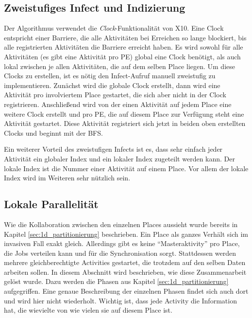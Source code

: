 \subsection{Zweistufiges Infect und Indizierung} %
\label{sub:zweistufiges_infect}
Der Algorithmus verwendet die \textit{Clock}-Funktionalität von X10. Eine Clock entspricht einer Barriere, die alle Aktivitäten bei Erreichen so lange blockiert, bis alle registrierten Aktivitäten die Barriere erreicht haben. Es wird sowohl für alle Aktivitäten (es gibt eine Aktivität pro PE) global eine Clock benötigt, als auch lokal zwischen je allen Aktivitäten, die auf dem selben Place liegen. Um diese Clocks zu erstellen, ist es nötig den Infect-Aufruf manuell zweistufig zu implementieren. Zunächst wird die globale Clock erstellt, dann wird eine Aktivität pro involviertem Place gestartet, die sich aber nicht in der Clock registrieren. Anschließend wird von der einen Aktivität auf jedem Place eine weitere Clock erstellt und pro PE, die auf diesem Place zur Verfügung steht eine Aktivität gestartet. Diese Aktivität registriert sich jetzt in beiden oben erstellten Clocks und beginnt mit der BFS.

Ein weiterer Vorteil des zweistufigen Infects ist es, dass sehr einfach jeder Aktivität ein globaler Index und ein lokaler Index zugeteilt werden kann. Der lokale Index ist die Nummer einer Aktivität auf einem Place. Vor allem der lokale Index wird im Weiteren sehr nützlich sein.

\subsection{Lokale Parallelität} %
\label{sub:lokale_parallelit_t}
Wie die Kollaboration zwischen den einzelnen Places aussieht wurde bereits in Kapitel \ref{sec:1d_partitionierung} beschrieben. Ein Place als ganzes Verhält sich im invasiven Fall exakt gleich. Allerdings gibt es keine \enquote{Masteraktivity} pro Place, die Jobs verteilen kann und für die Synchronisation sorgt. Stattdessen werden mehrere gleichberechtigte Activities gestartet, die trotzdem auf den selben Daten arbeiten sollen. In diesem Abschnitt wird beschrieben, wie diese Zusammenarbeit gelöst wurde. Dazu werden die Phasen aus Kapitel \ref{sec:1d_partitionierung} aufgegriffen. Eine genaue Beschreibung der einzelnen Phasen findet sich auch dort und wird hier nicht wiederholt. Wichtig ist, dass jede Activity die Information hat, die wievielte von wie vielen sie auf diesem Place ist.

